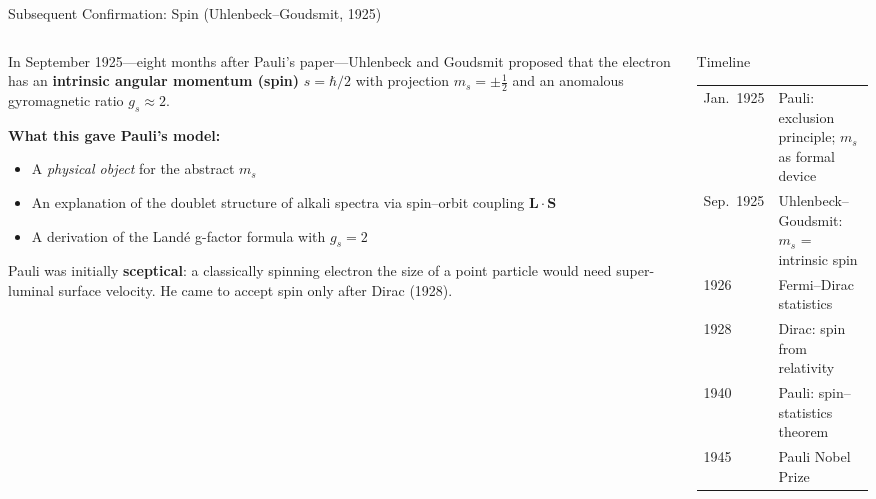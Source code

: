 \documentclass[aspectratio=169,12pt]{beamer}
\begin{document}
\begin{frame}[shrink=15]{Subsequent Confirmation: Spin (Uhlenbeck--Goudsmit, 1925)}

\begin{columns}[T]
\begin{column}{0.55\textwidth}
In September 1925---eight months after Pauli's paper---Uhlenbeck and
Goudsmit proposed that the electron has an \textbf{intrinsic angular
momentum (spin)} $s = \hbar/2$ with projection $m_s = \pm\tfrac{1}{2}$
and an anomalous gyromagnetic ratio $g_s \approx 2$.

\bigskip
\textbf{What this gave Pauli's model:}
\begin{itemize}
  \item A \emph{physical object} for the abstract $m_s$
  \item An explanation of the doublet structure of alkali spectra
    via spin--orbit coupling $\mathbf{L}\cdot\mathbf{S}$
  \item A derivation of the Landé g-factor formula with $g_s = 2$
\end{itemize}

\bigskip
Pauli was initially \textbf{sceptical}: a classically spinning electron
the size of a point particle would need super-luminal surface velocity.
He came to accept spin only after Dirac (1928).
\end{column}
\begin{column}{0.42\textwidth}
\begin{block}{Timeline}
\begin{tabular}{l p{4cm}}
Jan.\ 1925 & Pauli: exclusion principle; $m_s$ as formal device \\
Sep.\ 1925 & Uhlenbeck--Goudsmit: $m_s$ = intrinsic spin \\
1926 & Fermi--Dirac statistics \\
1928 & Dirac: spin from relativity \\
1940 & Pauli: spin--statistics theorem \\
1945 & Pauli Nobel Prize \\
\end{tabular}
\end{block}
\end{column}
\end{columns}

\end{frame}
\end{document}
